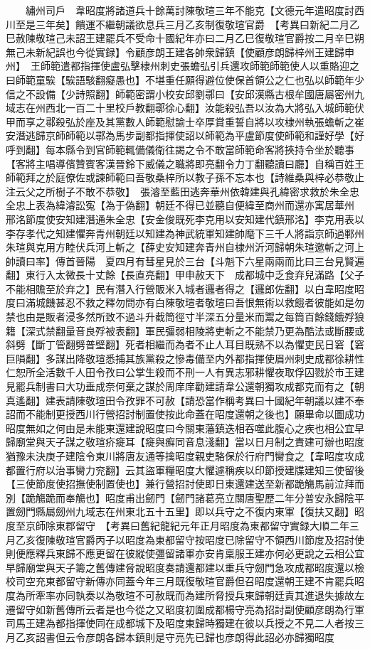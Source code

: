 　　繡州司戶　韋昭度將諸道兵十餘萬討陳敬瑄三年不能克【文德元年遣昭度討西川至是三年矣】饋運不繼朝議欲息兵三月乙亥制復敬瑄官爵　【考異曰新紀二月乙巳赦陳敬瑄己未詔王建罷兵不受命十國紀年亦曰二月乙巳復敬瑄官爵按二月辛巳朔無己未新紀誤也今從實録】令顧彦朗王建各帥衆歸鎮【使顧彦朗歸梓州王建歸申州】　王師範遣都指揮使盧弘擊棣州刺史張蟾弘引兵還攻師範師範使人以重賂迎之曰師範童騃【騃語駭翻癡愚也】不堪重任願得避位使保首領公之仁也弘以師範年少信之不設備【少詩照翻】師範密謂小校安邱劉鄩曰【安邱漢縣古根牟國唐屬密州九域志在州西北一百二十里校戶教翻鄩徐心翻】汝能殺弘吾以汝為大將弘入城師範伏甲而享之鄩殺弘於座及其黨數人師範慰諭士卒厚賞重誓自將以攻棣州執張蟾斬之崔安潛逃歸京師師範以鄩為馬步副都指揮使詔以師範為平盧節度使師範和謹好學【好呼到翻】每本縣令到官師範輒備儀衛往謁之令不敢當師範命客將挾持令坐於聽事【客將主唱導儐贊賓客漢晉鈴下威儀之職將即亮翻令力丁翻聽讀曰廳】自稱百姓王師範拜之於庭僚佐或諫師範曰吾敬桑梓所以教子孫不忘本也【詩維桑與梓必恭敬止注云父之所樹子不敢不恭敬】　張濬至藍田逃奔華州依韓建與孔緯密求救於朱全忠全忠上表為緯濬訟寃【為于偽翻】朝廷不得已並聽自便緯至商州而還亦寓居華州　邢洺節度使安知建潛通朱全忠【安金俊既死李克用以安知建代鎮邢洺】李克用表以李存孝代之知建懼奔青州朝廷以知建為神武統軍知建帥麾下三千人將詣京師過鄆州朱瑄與克用方睦伏兵河上斬之【薛史安知建奔青州自棣州沂河歸朝朱瑄邀斬之河上帥讀曰率】傳首晉陽　夏四月有彗星見於三台【斗魁下六星兩兩而比曰三台見賢遍翻】東行入太微長十丈餘【長直亮翻】甲申赦天下　成都城中乏食弃兒滿路【父子不能相贍至於弃之】民有潛入行營販米入城者邏者得之【邏郎佐翻】以白韋昭度昭度曰滿城饑甚忍不救之釋勿問亦有白陳敬瑄者敬瑄曰吾恨無術以救餓者彼能如是勿禁也由是販者浸多然所致不過斗升截筒徑寸半深五分量米而鬻之每筒百餘錢餓殍狼籍【深式禁翻量音良殍被表翻】軍民彊弱相陵將吏斬之不能禁乃更為酷法或斷腰或斜劈【斷丁管翻劈普壁翻】死者相繼而為者不止人耳目既熟不以為懼吏民日窘【窘巨隕翻】多謀出降敬瑄悉捕其族黨殺之慘毒備至内外都指揮使眉州刺史成都徐耕性仁恕所全活數千人田令孜曰公掌生殺而不刑一人有異志邪耕懼夜取俘囚戮於市王建見罷兵制書曰大功垂成奈何棄之謀於周庠庠勸建請韋公還朝獨攻成都克而有之【朝真遙翻】建表請陳敬瑄田令孜罪不可赦【請恐當作稱考異曰十國紀年朝議以建不奉詔而不能制更授西川行營招討制置使按此命蓋在昭度還朝之後也】願畢命以圖成功昭度無如之何由是未能東還建說昭度曰今關東藩鎮迭相吞噬此腹心之疾也相公宜早歸廟堂與天子謀之敬瑄疥㿅耳【㿅與癬同音息淺翻】當以日月制之責建可辦也昭度猶豫未決庚子建陰令東川將唐友通等擒昭度親吏駱保於行府門臠食之【韋昭度攻成都置行府以治事臠力兖翻】云其盜軍糧昭度大懼遽稱疾以印節授建牒建知三使留後【三使節度使招撫使制置使也】兼行營招討使即日東還建送至新都跪觴馬前泣拜而別【跪觴跪而奉觴也】昭度甫出劒門【劒門諸葛亮立關唐聖歷二年分普安永歸陰平置劒門縣屬劒州九域志在州東北五十五里】即以兵守之不復内東軍【復扶又翻】昭度至京師除東郡留守　【考異曰舊紀龍紀元年正月昭度為東都留守實録大順二年三月乙亥復陳敬瑄官爵丙子以昭度為東都留守按昭度已除留守不領西川節度及招討使則便應釋兵東歸不應更留在彼縱使彊留諸軍亦安肯稟服王建亦何必更說之云相公宜早歸廟堂與天子籌之舊傳建脅說昭度奏請還都建以重兵守劒門急攻成都昭度還以檢校司空充東都留守新傳亦同蓋今年三月既復敬瑄官爵但召昭度還朝王建不肯罷兵昭度為所牽率亦同執奏以為敬瑄不可赦既而為建所脅授兵東歸朝廷責其進退失據故左遷留守如新舊傳所云者是也今從之又昭度初圍成都楊守亮為招討副使顧彦朗為行軍司馬王建為都指揮使同在成都城下及昭度東歸時獨建在彼以兵授之不見二人者按三月乙亥詔書但云令彦朗各歸本鎮則是守亮先已歸也彦朗得此詔必亦歸獨昭度